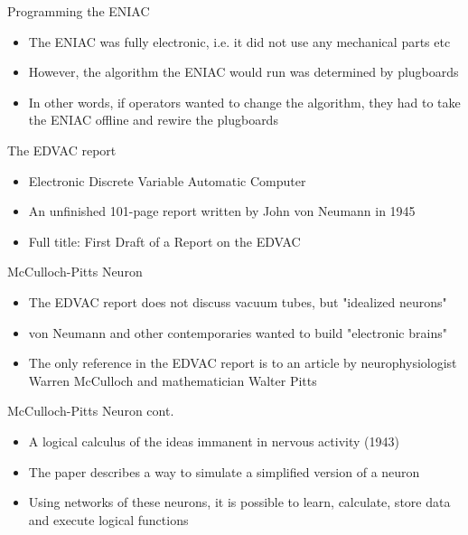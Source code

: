 \documentclass[utf8]{beamer}
\begin{document}
\begin{frame}{Programming the ENIAC}
\begin{itemize}
\item The ENIAC was fully electronic, i.e. it did not use any mechanical parts etc
\item However, the algorithm the ENIAC would run was determined by plugboards
\item In other words, if operators wanted to change the algorithm, they had to take the ENIAC offline and rewire the
plugboards
\end{itemize}
\end{frame}

\begin{frame}{The EDVAC report}
\begin{itemize}
\item Electronic Discrete Variable Automatic Computer
\item An unfinished 101-page report written by John von Neumann in 1945
\item Full title: First Draft of a Report on the EDVAC
\end{itemize}
\end{frame}

\begin{frame}{McCulloch-Pitts Neuron}
\begin{itemize}
\item The EDVAC report does not discuss vacuum tubes, but "idealized neurons"
\item von Neumann and other contemporaries wanted to build "electronic brains"
\item The only reference in the EDVAC report is to an article by neurophysiologist Warren McCulloch and mathematician Walter
Pitts
\end{itemize}
\end{frame}

\begin{frame}{McCulloch-Pitts Neuron cont.}
\begin{itemize}
\item A logical calculus of the ideas immanent in nervous activity (1943)
\item The paper describes a way to simulate a simplified version of a neuron
\item Using networks of these neurons, it is possible to learn, calculate, store data and execute logical functions
\end{itemize}
\end{frame}
\end{document}
